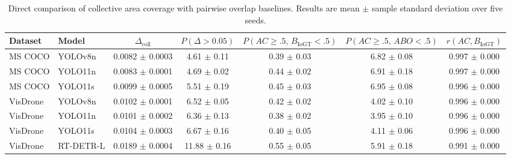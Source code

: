 \begin{table}[t]
\centering
\caption{Direct comparison of collective area coverage with pairwise overlap baselines. Results are mean $\pm$ sample standard deviation over five seeds.}
\label{tab:direct_metric_comparison}
\begin{tabular}{llccccc}
\hline
Dataset & Model & $\Delta_{\mathrm{coll}}$ & $P(\Delta>0.05)$ & $P(AC\geq.5,\,B_{\mathrm{IoGT}}<.5)$ & $P(AC\geq.5,\,ABO<.5)$ & $r(AC,B_{\mathrm{IoGT}})$ \\
\hline
MS COCO & YOLOv8n & 0.0082 $\pm$ 0.0003 & 4.61 $\pm$ 0.11 & 0.39 $\pm$ 0.03 & 6.82 $\pm$ 0.08 & 0.997 $\pm$ 0.000 \\
MS COCO & YOLO11n & 0.0083 $\pm$ 0.0001 & 4.69 $\pm$ 0.02 & 0.44 $\pm$ 0.02 & 6.91 $\pm$ 0.18 & 0.997 $\pm$ 0.000 \\
MS COCO & YOLO11s & 0.0099 $\pm$ 0.0005 & 5.51 $\pm$ 0.19 & 0.45 $\pm$ 0.03 & 6.95 $\pm$ 0.08 & 0.996 $\pm$ 0.000 \\
VisDrone & YOLOv8n & 0.0102 $\pm$ 0.0001 & 6.52 $\pm$ 0.05 & 0.42 $\pm$ 0.02 & 4.02 $\pm$ 0.10 & 0.996 $\pm$ 0.000 \\
VisDrone & YOLO11n & 0.0101 $\pm$ 0.0002 & 6.36 $\pm$ 0.13 & 0.38 $\pm$ 0.02 & 3.95 $\pm$ 0.10 & 0.996 $\pm$ 0.000 \\
VisDrone & YOLO11s & 0.0104 $\pm$ 0.0003 & 6.67 $\pm$ 0.16 & 0.40 $\pm$ 0.05 & 4.11 $\pm$ 0.06 & 0.996 $\pm$ 0.000 \\
VisDrone & RT-DETR-L & 0.0189 $\pm$ 0.0004 & 11.88 $\pm$ 0.16 & 0.55 $\pm$ 0.05 & 5.91 $\pm$ 0.18 & 0.991 $\pm$ 0.000 \\
\hline
\end{tabular}
\end{table}
